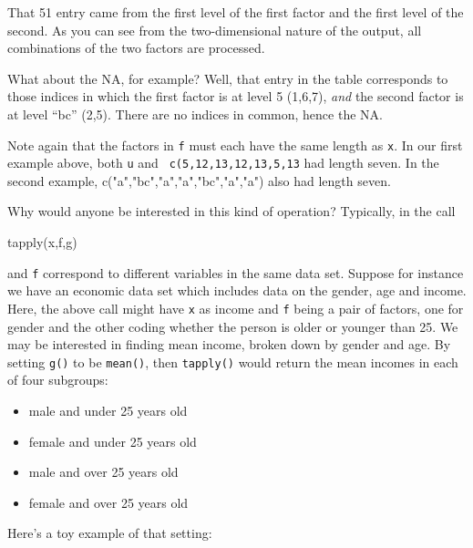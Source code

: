 That 51 entry came from the first level of the first factor and the
first level of the second.  As you can see from the two-dimensional
nature of the output, all combinations of the two factors are processed.

What about the NA, for example?  Well, that entry in the table
corresponds to those indices in which the first factor is at level 5
(1,6,7), {\it and} the second factor is at level ``bc'' (2,5).  There
are no indices in common, hence the NA.

Note again that the factors in {\tt f} must each have the same length as
{\tt x}.  In our first example above, both {\tt u} and {\tt
c(5,12,13,12,13,5,13} had length seven.  In the second example,
c("a","bc","a","a","bc","a","a") also had length seven. 

Why would anyone be interested in this kind of operation?  Typically, in
the call

\begin{Code}
tapply(x,f,g)
\end{Code}

 and {\tt f} correspond to different variables in the
same data set.  Suppose for instance we have an economic data set which
includes data on the gender, age and income.  Here, the above call might
have {\tt x} as income and {\tt f} being a pair of factors, one for
gender and the other coding whether the person is older or younger than
25.  We may be interested in finding mean income, broken down by gender
and age.  By setting {\tt g()} to be {\tt mean()}, then {\tt tapply()}
would return the mean incomes in each of four subgroups:

\begin{itemize}

\item male and under 25 years old

\item female and under 25 years old

\item male and over 25 years old

\item female and over 25 years old

\end{itemize}

\noindent
Here's a toy example of that setting:


